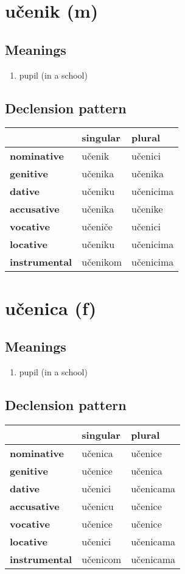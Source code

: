 \filbreak
\section{učenik (m)}
\subsection*{Meanings}
\begin{enumerate}
\item pupil (in a school)
\end{enumerate}
\subsection*{Declension pattern}
\begin{tabularx}{\linewidth}{Xll}
\toprule
{} &  singular &     plural \\
\midrule
\textbf{nominative  } &    učenik &    učenici \\
\textbf{genitive    } &   učenika &    učenika \\
\textbf{dative      } &   učeniku &  učenicima \\
\textbf{accusative  } &   učenika &    učenike \\
\textbf{vocative    } &   učeniče &    učenici \\
\textbf{locative    } &   učeniku &  učenicima \\
\textbf{instrumental} &  učenikom &  učenicima \\
\bottomrule
\end{tabularx}

\filbreak
\section{učenica (f)}
\subsection*{Meanings}
\begin{enumerate}
\item pupil (in a school)
\end{enumerate}
\subsection*{Declension pattern}
\begin{tabularx}{\linewidth}{Xll}
\toprule
{} &  singular &     plural \\
\midrule
\textbf{nominative  } &   učenica &    učenice \\
\textbf{genitive    } &   učenice &    učenica \\
\textbf{dative      } &   učenici &  učenicama \\
\textbf{accusative  } &   učenicu &    učenice \\
\textbf{vocative    } &   učenice &    učenice \\
\textbf{locative    } &   učenici &  učenicama \\
\textbf{instrumental} &  učenicom &  učenicama \\
\bottomrule
\end{tabularx}

